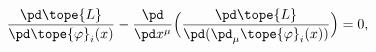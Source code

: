 \begin{equation}	\label{4.1}
\frac{\pd\tope{L}}{\pd\tope{\varphi}_i(x)}
-
\frac{\pd}{\pd x^\mu}
	\Bigl( \frac{\pd\tope{L}}{\pd (\pd_\mu\tope{\varphi}_i(x)) } \Bigr)
= 0 ,
	\end{equation}

